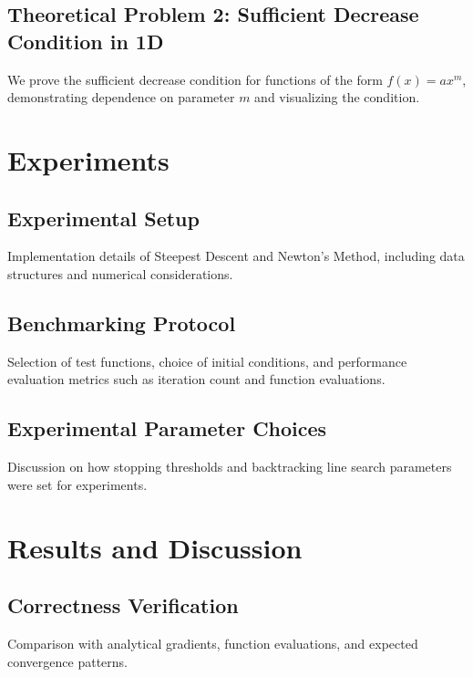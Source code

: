 \documentclass[12pt]{article}
\begin{document}
\subsection{Theoretical Problem 2: Sufficient Decrease Condition in 1D}
We prove the sufficient decrease condition for functions of the form $f(x) = ax^m$, demonstrating dependence on parameter $m$ and visualizing the condition.



\section{Experiments}

\subsection{Experimental Setup}
Implementation details of Steepest Descent and Newton's Method, including data structures and numerical considerations.

\subsection{Benchmarking Protocol}
Selection of test functions, choice of initial conditions, and performance evaluation metrics such as iteration count and function evaluations.

\subsection{Experimental Parameter Choices}
Discussion on how stopping thresholds and backtracking line search parameters were set for experiments.



\section{Results and Discussion}

\subsection{Correctness Verification}
Comparison with analytical gradients, function evaluations, and expected convergence patterns.
\end{document}
